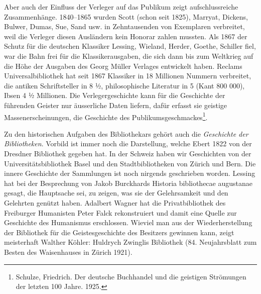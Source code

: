 \documentclass[a4paper,
fontsize=11pt,
oneside,
numbers=noperiodatend,
parskip=half-,
bibliography=totoc,
final
]{scrartcl}
\begin{document}
Aber auch der Einfluss der Verleger auf das Publikum zeigt
aufschlussreiche Zusammenhänge. 1840--1865 wurden Scott (schon seit
1825), Marryat, Dickens, Bulwer, Dumas, Sue, Sand usw. in Zehntausenden
von Exemplaren verbreitet, weil die Verleger diesen Ausländern kein
Honorar zahlen mussten. Als 1867 der Schutz für die deutschen Klassiker
Lessing, Wieland, Herder, Goethe, Schiller fiel, war die Bahn frei für
die Klassikerausgaben, die sich dann bis zum Weltkrieg auf die Höhe der
Ausgaben des Georg Müller Verlages entwickelt haben. Reclams
Universalbibliothek hat seit 1867 Klassiker in 18 Millionen Nummern
verbreitet, die antiken Schriftsteller in 8 ½, philosophische Literatur
in 5 (Kant 800 000), Ibsen 4 ½ Millionen. Die Verlegergeschichte kann
für die Geschichte der führenden Geister nur äusserliche Daten liefern,
dafür erfasst sie geistige Massenerscheinungen, die Geschichte des
Publikumsgeschmackes\footnote{Schulze, Friedrich. Der deutsche
  Buchhandel und die geistigen Strömungen der letzten 100 Jahre. 1925.}.

Zu den historischen Aufgaben des Bibliothekars gehört auch die
\emph{Geschichte der Bibliotheken}. Vorbild ist immer noch die
Darstellung, welche Ebert 1822 von der Dresdner Bibliothek gegeben hat.
In der Schweiz haben wir Geschichten von der Universitätsbibliothek
Basel und den Stadtbibliotheken von Zürich und Bern. Die innere
Geschichte der Sammlungen ist noch nirgends geschrieben worden. Lessing
hat bei der Besprechung von Jakob Burckhards Historia bibliothecae
augustanae gesagt, die Hauptsache sei, zu zeigen, was sie der
Gelehrsamkeit und den Gelehrten genützt haben. Adalbert Wagner hat die
Privatbibliothek des Freiburger Humanisten Peter Falck rekonstruiert und
damit eine Quelle zur Geschichte des Humanismus erschlossen. Wieviel man
aus der Wiederherstellung der Bibliothek für die Geistesgeschichte des
Besitzers gewinnen kann, zeigt meisterhaft Walther Köhler: Huldrych
Zwinglis Bibliothek (84. Neujahrsblatt zum Besten des Waisenhauses in
Zürich 1921).
\end{document}
